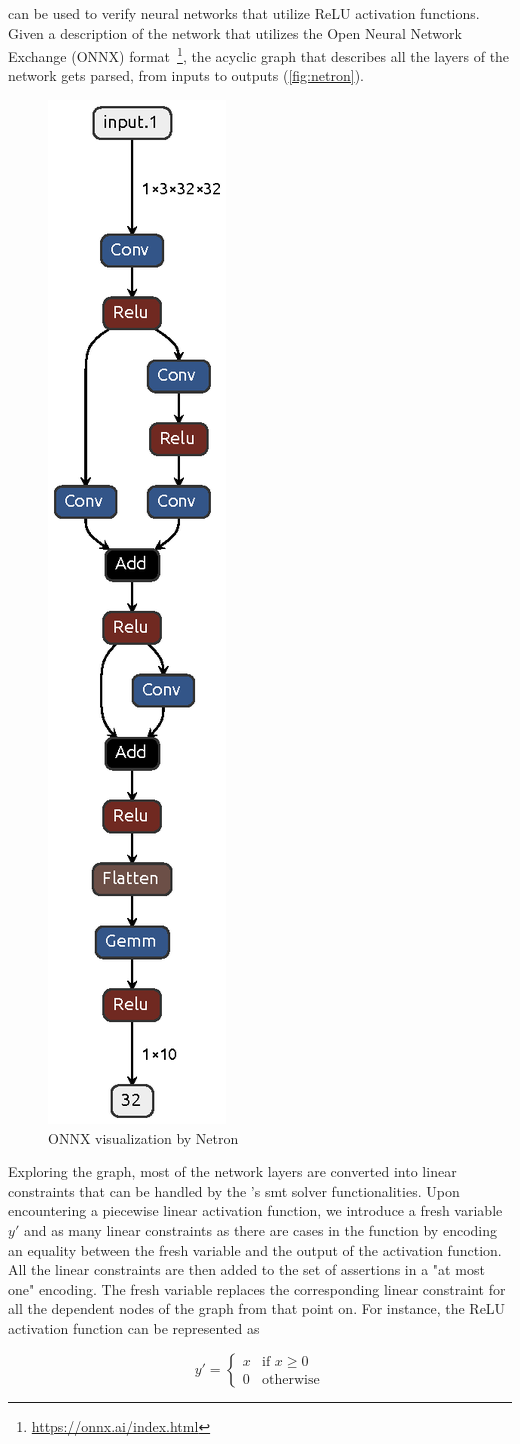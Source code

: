 \documentclass[runningheads]{llncs}
\begin{document}
\dlinear can be used to verify neural networks that utilize ReLU activation functions.
Given a description of the network that utilizes the Open Neural Network Exchange (ONNX) format~\footnote{\url{https://onnx.ai/index.html}}, the acyclic graph that describes all the layers of the network gets parsed, from inputs to outputs (\autoref{fig:netron}).

\begin{figure} %
    \centering
    \begin{adjustbox}{width=.1\textwidth,center}
        \includegraphics[width=.1\textwidth]{img/netron.eps}
    \end{adjustbox}
    \caption{ONNX visualization by Netron}\label{fig:netron}
\end{figure}

Exploring the graph, most of the network layers are converted into linear constraints that can be handled by the \dlinear's \gls{smt} solver functionalities.
Upon encountering a piecewise linear activation function, we introduce a fresh variable $y'$ and as many linear constraints as there are cases in the function by encoding an equality between the fresh variable and the output of the activation function.
All the linear constraints are then added to the set of assertions in a "at most one" encoding.
The fresh variable replaces the corresponding linear constraint for all the dependent nodes of the graph from that point on.
For instance, the ReLU activation function can be represented as

$$
    y' = \begin{cases}
        x & \text{if } x \ge 0 \\
        0 & \text{otherwise}
    \end{cases}
$$
\end{document}
